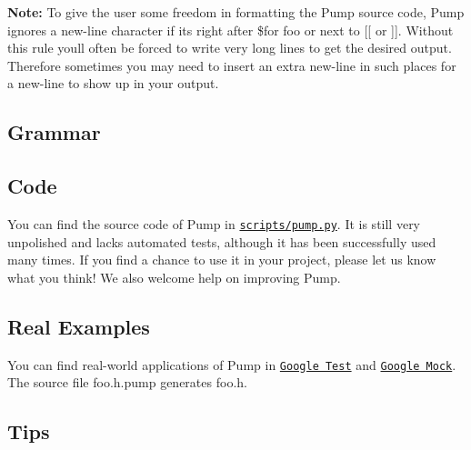 {\bfseries Note\+:} To give the user some freedom in formatting the Pump source code, Pump ignores a new-\/line character if it\textquotesingle{}s right after {\ttfamily \$for foo} or next to {\ttfamily \mbox{[}\mbox{[}} or {\ttfamily \mbox{]}\mbox{]}}. Without this rule you\textquotesingle{}ll often be forced to write very long lines to get the desired output. Therefore sometimes you may need to insert an extra new-\/line in such places for a new-\/line to show up in your output.

\subsection*{Grammar}




\subsection*{Code}

You can find the source code of Pump in \href{../scripts/pump.py}{\tt scripts/pump.\+py}. It is still very unpolished and lacks automated tests, although it has been successfully used many times. If you find a chance to use it in your project, please let us know what you think! We also welcome help on improving Pump.

\subsection*{Real Examples}

You can find real-\/world applications of Pump in \href{http://www.google.com/codesearch?q=file%3A\.pump%24+package%3Ahttp%3A%2F%2Fgoogletest\.googlecode\.com}{\tt Google Test} and \href{http://www.google.com/codesearch?q=file%3A\.pump%24+package%3Ahttp%3A%2F%2Fgooglemock\.googlecode\.com}{\tt Google Mock}. The source file {\ttfamily foo.\+h.\+pump} generates {\ttfamily foo.\+h}.

\subsection*{Tips}


